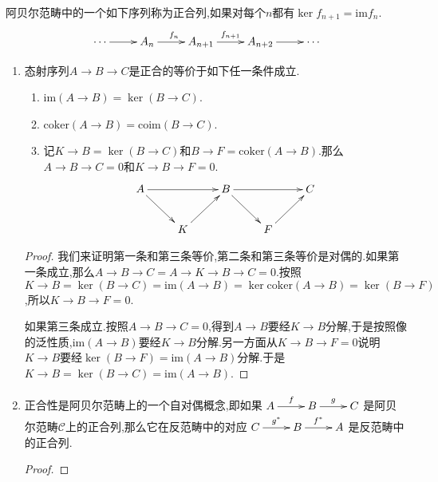 阿贝尔范畴中的一个如下序列称为正合列,如果对每个$n$都有$\ker f_{n+1}=\mathrm{im}f_n$.
$$\xymatrix{\cdots\ar[r]&A_n\ar[r]^{f_n}&A_{n+1}\ar[r]^{f_{n+1}}&A_{n+2}\ar[r]&\cdots}$$
\begin{enumerate}
	\item 态射序列$A\to B\to C$是正合的等价于如下任一条件成立.
	\begin{enumerate}
		\item $\mathrm{im}(A\to B)=\ker(B\to C)$.
		\item $\mathrm{coker}(A\to B)=\mathrm{coim}(B\to C)$.
		\item 记$K\to B=\ker(B\to C)$和$B\to F=\mathrm{coker}(A\to B)$.那么$A\to B\to C=0$和$K\to B\to F=0$.
		$$\xymatrix{A\ar[rr]\ar[dr]&&B\ar[rr]\ar[dr]&&C\\&K\ar[ur]&&F\ar[ur]&}$$
	\end{enumerate}
    \begin{proof}
    	
    	我们来证明第一条和第三条等价,第二条和第三条等价是对偶的.如果第一条成立,那么$A\to B\to C=A\to K\to B\to C=0$.按照$K\to B=\ker(B\to C)=\mathrm{im}(A\to B)=\ker\mathrm{coker}(A\to B)=\ker(B\to F)$,所以$K\to B\to F=0$.
    	
    	\qquad
    	
    	如果第三条成立.按照$A\to B\to C=0$,得到$A\to B$要经$K\to B$分解,于是按照像的泛性质,$\mathrm{im}(A\to B)$要经$K\to B$分解.另一方面从$K\to B\to F=0$说明$K\to B$要经$\ker(B\to F)=\mathrm{im}(A\to B)$分解.于是$K\to B=\ker(B\to C)=\mathrm{im}(A\to B)$.
    \end{proof}
	\item 正合性是阿贝尔范畴上的一个自对偶概念,即如果$\xymatrix{A\ar[r]^f&B\ar[r]^g&C}$是阿贝尔范畴$\mathscr{C}$上的正合列,那么它在反范畴中的对应$\xymatrix{C\ar[r]^{g^*}&B\ar[r]^{f^*}&A}$是反范畴中的正合列.
	\begin{proof}
		

\end{proof}
\end{enumerate}
